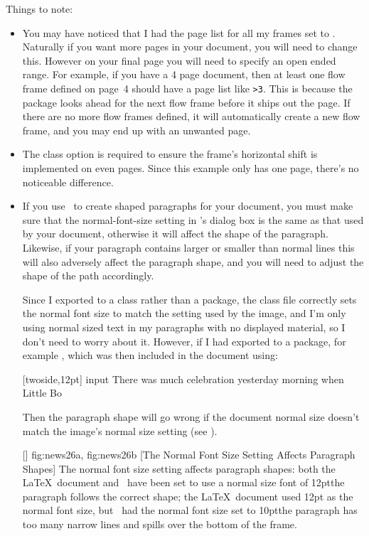 Things to note:
\begin{itemize}
\item You may have noticed that I had the page list for all my frames
set to . Naturally if you
want more pages in your document, you will need to change this.
However on your final page you will need to specify an open ended
range. For example, if you have a 4 page document, then at least
one flow frame defined on page~4 should have a page list like
\verb|>3|. This is because the  package looks ahead
for the next flow frame before it ships out the page. If there are
no more flow frames defined, it will automatically create a new
flow frame, and you may end up with an unwanted page.

\item The  class option is required to ensure the
 frame's horizontal shift is implemented on even pages.
Since this example only has one page, there's no noticeable
difference.

\item If you use \FlowframTk\ to create shaped paragraphs for your
document, you must make sure that the \gls{normal-font-size} setting
in \FlowframTk's  dialog box is the same as that
used by your document, otherwise it will affect the shape of the
paragraph.  Likewise, if your paragraph contains larger or smaller
than normal lines this will also adversely affect the paragraph
shape, and you will need to adjust the shape of the \gls{path}
accordingly.

Since I exported to a class rather than a package, the class file
correctly sets the normal font size to match the setting used by the
image, and I'm only using normal sized text in my paragraphs with no
displayed material, so I don't need to worry about it. However, if I
had exported to a package, for example , which was then
included in the document using:
\begin{codebox}
[twoside,12pt]
\codepar
{}
\gls{input}
There was much celebration yesterday morning when Little Bo
\end{codebox}
Then the paragraph shape will go wrong if the document normal size
doesn't match the image's normal size setting (see
).

[]
{
  {fig:news26a}{}{},
  {fig:news26b}{}{}
}
[The Normal Font Size Setting Affects Paragraph Shapes]
{The normal font size setting affects paragraph shapes:
 both the \LaTeX\ document and \FlowframTk\ have been
set to use a normal size font of 12pt\dash the paragraph follows the
correct shape;
 the \LaTeX\ document used 12pt as
the normal font size, but \FlowframTk\ had the normal font size set
to 10pt\dash the paragraph has too many narrow lines and spills over
the bottom of the frame.}

\end{itemize}

